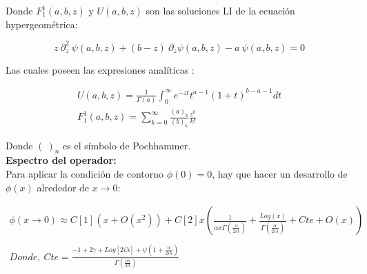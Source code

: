 Donde $F _1 ^1(a,b,z)$ y $ U(a,b,z)$ son las soluciones LI de la ecuación hypergeométrica:

\begin{equation}
    z \ \partial ^2 _z \ \psi (a,b,z) + (b-z) \
    \partial _z \psi (a,b,z)
    -a \ \psi (a,b,z) = 0
\end{equation}

Las cuales poseen las expresiones analíticas  : 

\begin{equation}
\begin{array}{c}
	U(a,b,z) = \frac{1}{\Gamma (a)} 
	\int _0 ^{\infty} e ^{-zt}
	t ^{a-1}
	(1+t) ^{b-a-1}
	dt \\
	F _1 ^1 (a,b,z) = \sum _ {k=0} ^{\infty} 
	\frac{(a) _k}{(b) _k} 
	\frac{z ^k}{k!} 
\end{array}
\end{equation}

Donde $( \   ) _n$ es el símbolo de Pochhammer. \\






\textbf{Espectro del operador:} \\


Para aplicar la condición de contorno $\phi (0) = 0$, hay que hacer un desarrollo de $\phi(x)$  alrededor de $x \rightarrow 0$:

\begin{equation}
\begin{array}{c}
\phi (x \rightarrow 0) \approx
C[1] ( x + O(x ^2)) + 
C[2] x 
\left( 
\frac{1}{  \alpha x  \Gamma ( \frac{ \alpha}{2 i \lambda}  )   }  +
\frac{Log(x) }{\Gamma ( \frac{ \alpha}{2 i \lambda} ) } + Cte + O(x)
\right)
\\ \\
Donde,  \ Cte = 
\frac{
-1 + 2 \gamma + Log[2 i \lambda] + \psi (1 + \frac{ \alpha}{2 i \lambda})
}
{\Gamma (\frac{i \alpha}{2 \lambda})}
\end{array}
\label{eq.scat}
\end{equation}

